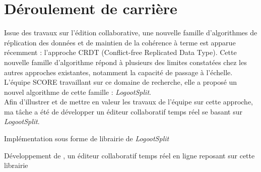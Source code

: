 \documentclass[]{deedy-resume-openfont}
\begin{document}
%
%

%
%

%
%


\section{Déroulement de carrière}

\sectionsep

\sectionsep

\sectionsep

\hfill\begin{minipage}{\dimexpr\textwidth-0.5cm}
Issue des travaux sur l'édition collaborative, une nouvelle famille d'algorithmes de réplication des données
et de maintien de la cohérence à terme est apparue récemment : l'approche CRDT (Conflict-free Replicated Data Type).
Cette nouvelle famille d'algorithme répond à plusieurs des limites constatées chez les autres approches existantes,
notamment la capacité de passage à l'échelle.
\\
L'équipe SCORE travaillant sur ce domaine de recherche, elle a proposé un nouvel algorithme de cette famille : \emph{LogootSplit}.
\\
Afin d'illustrer et de mettre en valeur les travaux de l'équipe sur cette approche,
ma tâche a été de développer un éditeur collaboratif temps réel se basant sur \emph{LogootSplit}.
\begin{tightemize}
\item Implémentation sous forme de librairie de \emph{LogootSplit}
\item Développement de \href{https://www.coedit.re}{}, un éditeur collaboratif temps réel en ligne reposant sur cette librairie
\end{tightemize}
\sectionsep\xdef\tpd{\the\prevdepth}
\end{minipage}
\end{document}
